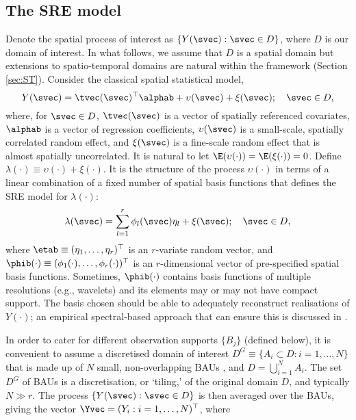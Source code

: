 \subsection{The SRE model} \label{sec:SREModel}

Denote the spatial process of interest as $\{Y(\svec) : \svec \in D\}$, where $D$ is our domain of interest. In what follows, we assume that $D$ is a spatial domain but extensions to spatio-temporal domains are natural within the framework (Section \ref{sec:ST}). Consider the classical spatial statistical model,
\begin{equation*}
Y(\svec) = \tvec(\svec)^\top\alphab + \upsilon(\svec) + \xi(\svec); \quad \svec \in D,
\end{equation*}
where, for $\svec \in D$, $\tvec(\svec)$ is a vector of spatially referenced covariates, $\alphab$ is a vector of regression coefficients, $\upsilon(\svec)$ is a small-scale, spatially correlated random effect, and $\xi(\svec)$ is a fine-scale random effect that is almost spatially uncorrelated. It is natural to let $\E(\upsilon(\cdot)) = \E(\xi(\cdot)) = 0$. Define $\lambda(\cdot) \equiv \upsilon(\cdot) + \xi(\cdot)$. It is the structure of the process $\upsilon(\cdot)$ in terms of a linear combination of a fixed number of spatial basis functions that defines the SRE model for $\lambda(\cdot)$:
$$
\lambda(\svec) = \sum_{l=1}^r \phi_l(\svec)\eta_l + \xi(\svec);\quad \svec \in D,
$$
\noindent where $\etab \equiv (\eta_1,\dots,\eta_r)^\top$ is an $r$-variate random vector, and $\phib(\cdot) \equiv (\phi_1(\cdot),\dots,\phi_r(\cdot))^\top$ is an $r$-dimensional vector of pre-specified spatial basis functions. Sometimes, $\phib(\cdot)$ contains basis functions of multiple resolutions (e.g., wavelets) and its elements may or may not have compact support. The basis chosen should be able to adequately reconstruct realisations of $Y(\cdot)$; an empirical spectral-based approach that can ensure this is discussed in \cite{Zammit_2012}.

In order to cater for different observation supports $\{B_j\}$ (defined below), it is convenient to assume a discretised domain of interest $D^G \equiv \{A_i \subset D: i = 1,\dots,N\}$ that is made up of $N$ small, non-overlapping BAUs \citep{Nguyen_2012}, and $D = \bigcup_{i=1}^N A_i$. The set $D^G$ of BAUs is a discretisation, or `tiling,' of the original domain $D$, and typically $N \gg r$. The process $\{Y(\svec): \svec \in D\}$ is then averaged over the BAUs, giving the vector $\Yvec = (Y_i : i = 1,\dots,N)^\top$, where

